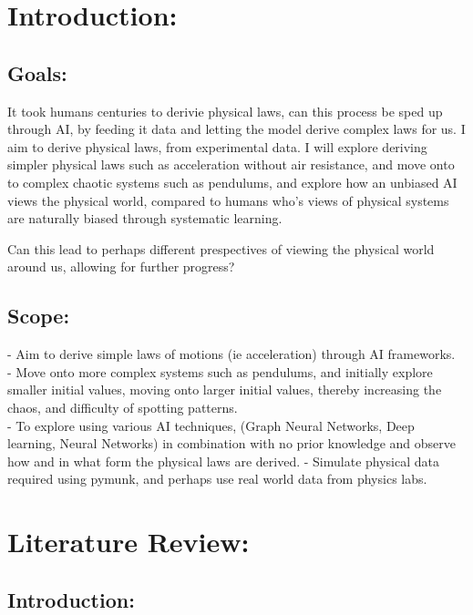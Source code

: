 \documentclass{article}
\begin{document}
\section{Introduction: }

\subsection{Goals: }

It took humans centuries to derivie physical laws, can this process be sped up through AI, by feeding it data and letting the model derive complex laws for us. I aim to derive physical laws, from experimental data. I will explore deriving simpler physical laws such as acceleration without air resistance, and move onto to complex chaotic systems such as pendulums, and explore how an unbiased AI views the physical world, compared to humans who's views of physical systems are naturally biased through systematic learning. 

Can this lead to perhaps different prespectives of viewing the physical world around us, allowing for further progress? 


\subsection{Scope: }


 - Aim to derive simple laws of motions (ie acceleration) through AI frameworks.\\ 

- Move onto more complex systems such as pendulums, and initially explore smaller initial values, moving onto larger initial values, 
thereby increasing the chaos, and difficulty of spotting patterns. \\

- To explore using various AI techniques, (Graph Neural Networks, Deep learning, Neural Networks) in combination with no prior knowledge and observe how and in what form the physical laws are derived.  
- Simulate physical data required using pymunk, and perhaps use real world data from physics labs.\\ 

\section{Literature Review: }

\subsection{ Introduction: }
  
\end{document}
